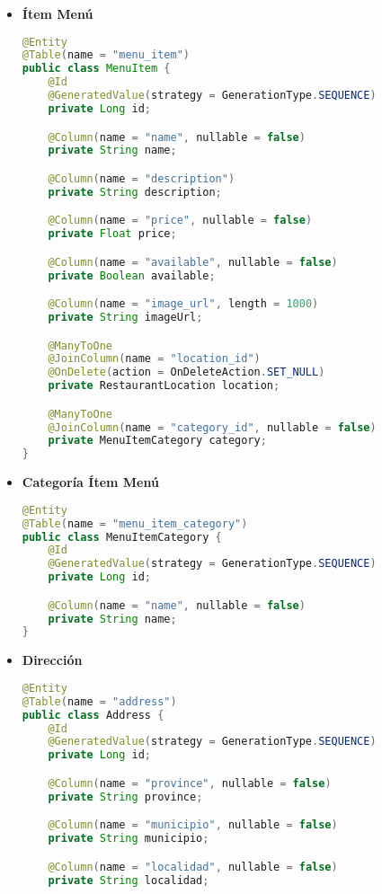\begin{itemize}
\item \textbf{Ítem Menú}

\begin{lstlisting}[style=common, language=Java]
@Entity
@Table(name = "menu_item")
public class MenuItem {
    @Id
    @GeneratedValue(strategy = GenerationType.SEQUENCE)
    private Long id;

    @Column(name = "name", nullable = false)
    private String name;

    @Column(name = "description")
    private String description;

    @Column(name = "price", nullable = false)
    private Float price;

    @Column(name = "available", nullable = false)
    private Boolean available;

    @Column(name = "image_url", length = 1000)
    private String imageUrl;

    @ManyToOne
    @JoinColumn(name = "location_id")
    @OnDelete(action = OnDeleteAction.SET_NULL)
    private RestaurantLocation location;

    @ManyToOne
    @JoinColumn(name = "category_id", nullable = false)
    private MenuItemCategory category;
}
\end{lstlisting}


\item \textbf{Categoría Ítem Menú}

\begin{lstlisting}[style=common, language=Java]
@Entity
@Table(name = "menu_item_category")
public class MenuItemCategory {
    @Id
    @GeneratedValue(strategy = GenerationType.SEQUENCE)
    private Long id;

    @Column(name = "name", nullable = false)
    private String name;
}
\end{lstlisting}


\item \textbf{Dirección}

\begin{lstlisting}[style=common, language=Java]
@Entity
@Table(name = "address")
public class Address {
    @Id
    @GeneratedValue(strategy = GenerationType.SEQUENCE)
    private Long id;

    @Column(name = "province", nullable = false)
    private String province;

    @Column(name = "municipio", nullable = false)
    private String municipio;

    @Column(name = "localidad", nullable = false)
    private String localidad;


\end{lstlisting}
\end{itemize}
